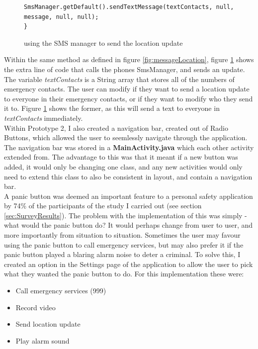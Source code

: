 \documentclass[a4paper]{report}
\begin{document}
\begin{figure}[H] 
	\singlespacing
	\begin{lstlisting} 
SmsManager.getDefault().sendTextMessage(textContacts, null, message, null, null);
}
\end{lstlisting}
\caption{using the SMS manager to send the location update} 
\label{fig:textLocation}
\end{figure}
Within the same method as defined in figure \ref{fig:messageLocation}, figure \ref{fig:textLocation} shows the extra line of code that calls the phones SmsManager, and sends an update. The variable \textit{textContacts} is a String array that stores all of the numbers of emergency contacts. The user can modify if they want to send a location update to everyone in their emergency contacts, or if they want to modify who they send it to. Figure \ref{fig:textLocation} shows the former, as this will send a text to everyone in \textit{textContacts} immediately. 
\\Within Prototype 2, I also created a navigation bar, created out of Radio Buttons, which allowed the user to seemlessly navigate through the application. The navigation bar was stored in a \textbf{MainActivity.java} which each other activity extended from. The advantage to this was that it meant if a new button was added, it would only be changing one class, and any new activities would only need to extend this class to also be consistent in layout, and contain a navigation bar. \\A panic button was deemed an important feature to a personal safety application by 74\% of the participants of the study I carried out (see section \ref{sec:SurveyResults}). The problem with the implementation of this was simply - what would the panic button do? It would perhaps change from user to user, and more importantly from situation to situation. Sometimes the user may favour using the panic button to call emergency services, but may also prefer it if the panic button played a blaring alarm noise to deter a criminal. To solve this, I created an option in the Settings page of the application to allow the user to pick what they wanted the panic button to do. For this implementation these were: 
\begin{itemize}
	\item Call emergency services (999)
	\item Record video 
	\item Send location update
	\item Play alarm sound
\end{itemize}
\end{document}
